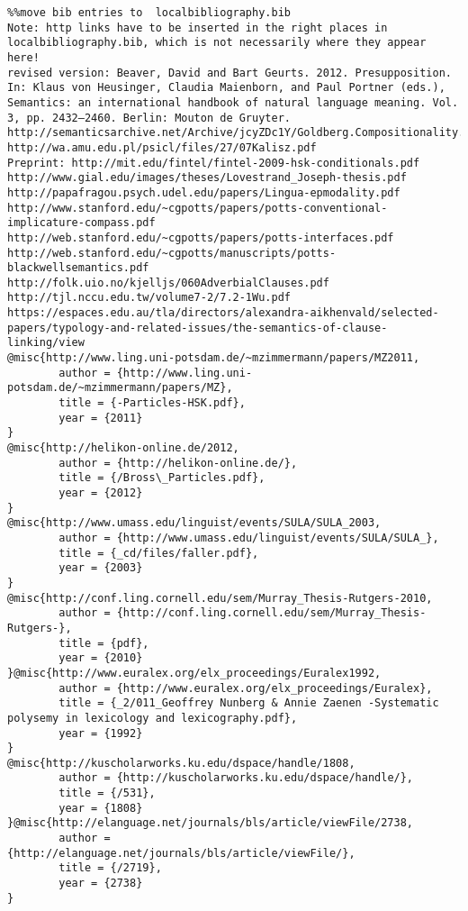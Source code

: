 \begin{verbatim}%%move bib entries to  localbibliography.bib
Note: http links have to be inserted in the right places in localbibliography.bib, which is not necessarily where they appear here!
revised version: Beaver, David and Bart Geurts. 2012. Presupposition. In: Klaus von Heusinger, Claudia Maienborn, and Paul Portner (eds.), Semantics: an international handbook of natural language meaning. Vol. 3, pp. 2432–2460. Berlin: Mouton de Gruyter.
http://semanticsarchive.net/Archive/jcyZDc1Y/Goldberg.Compositionality.RoutledgeHandbook.pdf
http://wa.amu.edu.pl/psicl/files/27/07Kalisz.pdf
Preprint: http://mit.edu/fintel/fintel-2009-hsk-conditionals.pdf
http://www.gial.edu/images/theses/Lovestrand_Joseph-thesis.pdf
http://papafragou.psych.udel.edu/papers/Lingua-epmodality.pdf
http://www.stanford.edu/~cgpotts/papers/potts-conventional-implicature-compass.pdf
http://web.stanford.edu/~cgpotts/papers/potts-interfaces.pdf
http://web.stanford.edu/~cgpotts/manuscripts/potts-blackwellsemantics.pdf
http://folk.uio.no/kjelljs/060AdverbialClauses.pdf
http://tjl.nccu.edu.tw/volume7-2/7.2-1Wu.pdf
https://espaces.edu.au/tla/directors/alexandra-aikhenvald/selected-papers/typology-and-related-issues/the-semantics-of-clause-linking/view
@misc{http://www.ling.uni-potsdam.de/~mzimmermann/papers/MZ2011,
        author = {http://www.ling.uni-potsdam.de/~mzimmermann/papers/MZ},
        title = {-Particles-HSK.pdf},
        year = {2011}
}
@misc{http://helikon-online.de/2012,
        author = {http://helikon-online.de/},
        title = {/Bross\_Particles.pdf},
        year = {2012}
}
@misc{http://www.umass.edu/linguist/events/SULA/SULA_2003,
        author = {http://www.umass.edu/linguist/events/SULA/SULA_},
        title = {_cd/files/faller.pdf},
        year = {2003}
}
@misc{http://conf.ling.cornell.edu/sem/Murray_Thesis-Rutgers-2010,
        author = {http://conf.ling.cornell.edu/sem/Murray_Thesis-Rutgers-},
        title = {pdf},
        year = {2010}
}@misc{http://www.euralex.org/elx_proceedings/Euralex1992,
        author = {http://www.euralex.org/elx_proceedings/Euralex},
        title = {_2/011_Geoffrey Nunberg & Annie Zaenen -Systematic polysemy in lexicology and lexicography.pdf},
        year = {1992}
}
@misc{http://kuscholarworks.ku.edu/dspace/handle/1808,
        author = {http://kuscholarworks.ku.edu/dspace/handle/},
        title = {/531},
        year = {1808}
}@misc{http://elanguage.net/journals/bls/article/viewFile/2738,
        author = {http://elanguage.net/journals/bls/article/viewFile/},
        title = {/2719},
        year = {2738}
}
\end{verbatim}